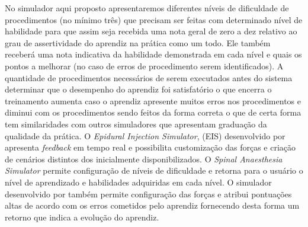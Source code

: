 No simulador aqui proposto apresentaremos diferentes níveis de dificuldade de procedimentos (no mínimo três) que precisam ser feitas com determinado nível de habilidade para que assim seja recebida uma nota geral de zero a dez relativo ao grau de assertividade do aprendiz na prática como um todo. Ele também receberá uma nota indicativa da habilidade demonstrada em cada nível e quais os pontos a melhorar (no caso de erros de procedimento serem identificados). A quantidade de procedimentos necessários de serem executados antes do sistema determinar que o desempenho do aprendiz foi satisfatório o que encerra o treinamento aumenta caso o aprendiz apresente muitos erros nos procedimentos e diminui com os procedimentos sendo feitos da forma correta o que de certa forma tem similaridades com outros simuladores que apresentam graduação da qualidade da prática. O \textit{Epidural Injection Simulator}, (EIS) desenvolvido por \textcite{Wilson2003} apresenta \textit{feedback} em tempo real e possibilita customização das forças e criação de cenários distintos dos inicialmente disponibilizados. O \textit{Spinal Anaesthesia Simulator} \cite{Albert2007,Dreifaldt2006} permite configuração de níveis de dificuldade e retorna para o usuário o nível de aprendizado e habilidades adquiridas em cada nível. O simulador desenvolvido por \textcite{Brazil2017} também permite configuração das forças e atribui pontuações altas de acordo com os erros cometidos pelo aprendiz fornecendo desta forma um retorno que indica a evolução do aprendiz. 
